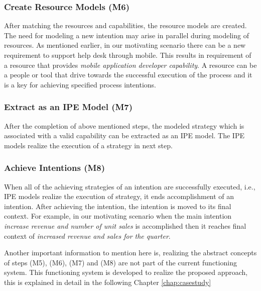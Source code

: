 \subsubsection{Create Resource Models (M6)}  
After matching the resources and capabilities, the resource models are created. The need for modeling a new intention may arise in parallel during modeling of resources. As mentioned earlier, in our motivating scenario there can be a new requirement to support help desk through mobile. This results in requirement of a resource that provides \textit{mobile application developer capability}. A resource can be a people or tool that drive towards the successful execution of the process and it is a key for achieving specified process intentions. 

\subsubsection{Extract as an IPE Model (M7)}  
After the completion of above mentioned steps, the modeled strategy which is associated with a valid capability can be extracted as an IPE model. The IPE models realize the execution of a strategy in next step. 

\subsubsection{Achieve Intentions (M8)}
When all of the achieving strategies of an intention are successfully executed, i.e., IPE models realize the execution of strategy, it ends accomplishment of an intention. After achieving the intention, the intention is moved to its final context. For example, in our motivating scenario when the main intention \textit{increase revenue and number of unit sales} is accomplished then it reaches final context of \textit{increased revenue and sales for the quarter}. 

Another important information to mention here is, realizing the abstract concepts of steps (M5), (M6), (M7) and (M8) are not part of the current functioning system. This functioning system is developed to realize the proposed approach, this is explained in detail in the following Chapter \ref{chap:casestudy}  
 
